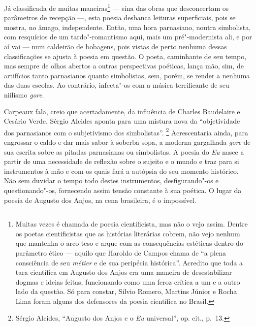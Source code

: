 Já classificada de muitas maneiras\footnote{ Muitas vezes é chamada
de poesia cientificista, mas não o vejo assim. Dentre os poetas
cientificistas que as histórias literárias cobrem, não vejo nenhum que
mantenha o arco teso e arque com as consequências estéticas dentro do
parâmetro ético --- aquilo que Haroldo de Campos chama de “a plena
consciência de seu \textit{métier} e de sua peripécia histórica”.
Acredito que toda a tara científica em Augusto dos Anjos era uma
maneira de desestabilizar dogmas e ideias feitas, funcionando como uma
feroz crítica a um e a outro lado da questão. Só para constar, Silvio
Romero, Martins Júnior e Rocha Lima foram alguns dos defensores da
poesia científica no Brasil.} --- sina das obras que desconcertam os
parâmetros de recepção ---, esta poesia desbanca leituras superficiais,
pois se mostra, no âmago, independente. Então, uma hora parnasiano,
noutra simbolista, com resquícios de um tardo"-romantismo aqui, mais um
pré"-modernista ali, e por aí vai --- num caldeirão de bobagens, pois
vistas de perto nenhuma dessas classificações se ajusta à poesia em
questão. O poeta, caminhante de seu tempo, mas sempre de olhos abertos
a outras perspectivas poéticas, lança mão, sim, de artifícios tanto
parnasianos quanto simbolistas, sem, porém, se render a nenhuma das
duas escolas. Ao contrário, infecta"-os com a música terrificante de
seu niilismo \textit{gore}. 

Carpeaux fala, creio que acertadamente, da influência de Charles
Baudelaire e Cesário Verde. Sérgio Alcides aponta para uma mistura nova
da “objetividade dos parnasianos com o subjetivismo dos simbolistas”.
\footnote{Sérgio Alcides, “Augusto dos Anjos e o \textit{Eu} universal”, 
op. cit., p.~13.} Acrescentaria ainda, para engrossar o caldo e dar
mais sabor à soberba sopa, a moderna gargalhada \textit{gore} de sua
escrita sobre as pitadas parnasianas ou simbolistas. A poesia do
\textit{Eu} nasce a partir de uma necessidade de reflexão sobre o
sujeito e o mundo e traz para si instrumentos à mão e com os quais fará
a autópsia do seu momento histórico. Não sem duvidar o tempo todo
destes instrumentos, desfigurando"-os e questionando"-os, fornecendo
assim tensão constante à sua poética. O lugar da poesia de Augusto dos
Anjos, na cena brasileira, é o impossível.

